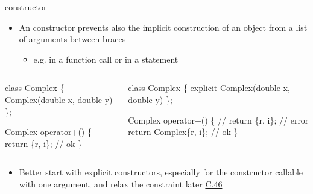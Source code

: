 \begin{frame}[fragile]{ constructor \insertcontinuationtext}

  \begin{itemize}
  \item An  constructor prevents also the implicit construction
    of an object from a list of arguments between braces
    \begin{itemize}
    \item e.g. in a function call or in a  statement
    \end{itemize}
  \end{itemize}

  \begin{columns}[t]
    \begin{column}{.45\textwidth}
      \begin{codeblock}
class Complex \{
  \ddd
  Complex(double x, double y) \ddd
\};

Complex operator+(\ddd)
\{
  \ddd
  return \{r, i\}; // ok
\}\end{codeblock}

    \end{column}

    \begin{column}{.55\textwidth}
      \begin{codeblock}
class Complex \{
  \ddd
  \alert{explicit} Complex(double x, double y) \ddd
\};

Complex operator+(\ddd)
\{
  \ddd
  // return \{r, i\}; // error
  return Complex\{r, i\}; // ok
\}\end{codeblock}

    \end{column}

  \end{columns}

  \begin{itemize}
  \item<2> Better start with explicit constructors, especially for the
    constructor callable with one argument, and relax the constraint later
    \href{https://isocpp.github.io/CppCoreGuidelines/CppCoreGuidelines#c46-by-default-declare-single-argument-constructors-explicit}{C.46}
  \end{itemize}

\end{frame}

